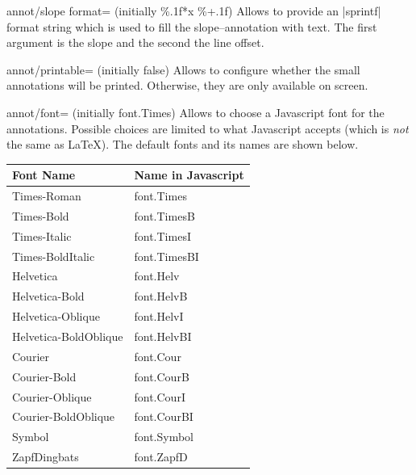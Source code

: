 \begin{pgfplotskey}{annot/slope format= (initially \%.1f*x \%+.1f)}
	Allows to provide an |sprintf| format string which is used to fill the slope--annotation with text.
	The first argument is the slope and the second the line offset.
\end{pgfplotskey}

\begin{pgfplotskey}{annot/printable= (initially false)}
	Allows to configure whether the small annotations will be printed. Otherwise, they are only available on screen.
\end{pgfplotskey}

\begin{pgfplotskey}{annot/font= (initially font.Times)}
	Allows to choose a Javascript font for the annotations. Possible choices are limited to what Javascript accepts (which is \emph{not} the same as \LaTeX). The default fonts and its names are shown below.

	\begin{center}
	\begin{tabular}{ll}
		\toprule
		Font Name	& Name in Javascript\\
		\midrule
		Times-Roman           & font.Times\\
        Times-Bold            & font.TimesB\\
        Times-Italic          & font.TimesI\\
        Times-BoldItalic      & font.TimesBI\\
        Helvetica             & font.Helv\\
        Helvetica-Bold        & font.HelvB\\
        Helvetica-Oblique     & font.HelvI\\
        Helvetica-BoldOblique & font.HelvBI\\
        Courier               & font.Cour\\
        Courier-Bold          & font.CourB\\
        Courier-Oblique       & font.CourI\\
        Courier-BoldOblique   & font.CourBI\\
        Symbol                & font.Symbol\\
        ZapfDingbats          & font.ZapfD\\
		\bottomrule
	\end{tabular}
	\end{center}
\end{pgfplotskey}


